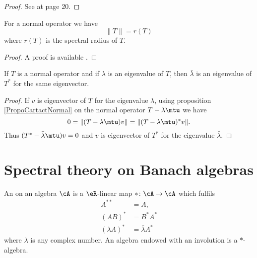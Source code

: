 \begin{proof}
    See \cite{AndrewGreen} at page 20.
\end{proof}

\begin{proposition}
    For a normal operator we have
    \begin{equation}
        \| T \|=r(T)
    \end{equation}
    where \( r(T)\) is the spectral radius of \( T\). 
\end{proposition}

\begin{proof}
    A proof is available .
\end{proof}

\begin{proposition}
    If \( T\) is a normal operator and if \( \lambda\) is an eigenvalue of \( T\), then \( \bar\lambda\) is an eigenvalue of \( T^*\) for the same eigenvector.
\end{proposition}

\begin{proof}
    If \( v\) is eigenvector of \( T\) for the eigenvalue \( \lambda\), using proposition \ref{PropoCartactNormal} on the normal operator \( T-\lambda\mtu\) we have
    \begin{equation}
        0=\| (T-\lambda\mtu)v \|=\| (T-\lambda\mtu)^*v \|.
    \end{equation}
    Thus \( (T^*-\bar\lambda \mtu)v=0\) and \( v\) is eigenvector of \( T^*\) for the eigenvalue \( \bar\lambda\).
\end{proof}

\section{Spectral theory on Banach algebras}		\label{Sec_SpecBanach}

\begin{definition}      \label{DefInvolutionALge}
    An  on an algebra $\cA$ is a $\eR$-linear map $*\colon \cA\to \cA$ which fulfils
    \begin{subequations}
    \begin{align}
      A^{**}&=A,\\
        (AB)^*&=B^*A^*\\
        (\lambda A)^*&=\overline{\lambda }A^*
    \end{align}
    \end{subequations}
    where $\lambda$ is any complex number. An algebra endowed with an involution is a $*$-algebra.
\end{definition}

